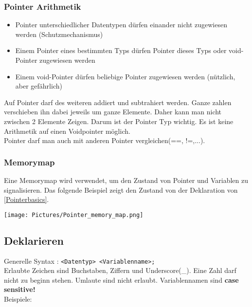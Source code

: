 

\subsubsection{Pointer Arithmetik}

\begin{itemize}[itemsep=1pt, parsep=0pt]
    \item Pointer unterschiedlicher Datentypen dürfen einander nicht zugewiesen werden (Schutzmechanismus)
    \item Einem Pointer eines bestimmten Typs dürfen Pointer dieses Typs oder void-Pointer zugewiesen werden
    \item Einem void-Pointer dürfen beliebige Pointer zugewiesen werden (nützlich, aber gefährlich)
\end{itemize}
Auf Pointer darf des weiteren addiert und subtrahiert werden. Ganze zahlen verschieben ihn dabei jeweils um ganze Elemente. 
Daher kann man nicht zwischen 2 Elemente Zeigen. Darum ist der Pointer Typ wichtig. 
Es ist keine Arithmetik auf einen Voidpointer möglich.\\
Pointer darf man auch mit anderen Pointer vergleichen(==, !=,...).

\nextcol

\subsubsection{Memorymap}

Eine Memorymap wird verwendet, um den Zustand von Pointer und Variablen zu signalisieren. 
Das folgende Beispiel zeigt den Zustand von der Deklaration von \ref{Pointerbasics}.\\
\begin{center}
    \texttt{[image: Pictures/Pointer\_memory\_map.png]}
\end{center}

\subsection{Deklarieren}

Generelle Syntax : \verb|<Datentyp> <Variablenname>;|\\
Erlaubte Zeichen sind Buchstaben, Ziffern und Underscore(\_). Eine Zahl darf nicht zu beginn stehen. Umlaute sind nicht erlaubt. Variablennamen sind \textbf{case sensitive!}\\
Beispiele:

